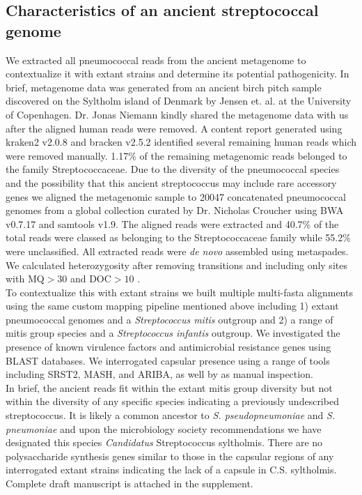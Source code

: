 \documentclass{article}
\begin{document}
\subsection{Characteristics of an ancient streptococcal genome }
We extracted all pneumococcal reads from the ancient metagenome to contextualize it with extant strains and determine its potential pathogenicity. In brief, metagenome data was generated from an ancient birch pitch sample discovered on the Syltholm island of Denmark by Jensen et. al. at the University of Copenhagen\cite{jensen5700YearoldHuman2019}. Dr. Jonas Niemann kindly shared the metagenome data with us after the aligned human reads were removed. A content report generated using kraken2 v2.0.8 and bracken v2.5.2 \cite{KrakenUltrafastMetagenomic,luBrackenEstimatingSpecies2017} identified several remaining human reads which were removed manually. 1.17\% of the remaining metagenomic reads belonged to the family Streptococcaceae. Due to the diversity of the pneumococcal species and the  possibility that this ancient streptococcus may include rare accessory genes we aligned the metagenomic sample to 20047 concatenated pneumococcal genomes from a global collection curated by Dr. Nicholas Croucher using BWA v0.7.17 and samtools v1.9\cite{liStatisticalFrameworkSNP2011,liFastAccurateShort2009,gladstoneInternationalGenomicDefinition2019b}. The aligned reads were extracted and 40.7\% of the total reads were classed as belonging to the Streptococcaceae family while 55.2\% were unclassified. All extracted reads were \textit{de novo} assembled using metaspades\cite{nurkMetaSPAdesNewVersatile2017}. We calculated heterozygosity after removing transitions and including only sites with MQ$>30$ and DOC$>10$ \cite{liStatisticalFrameworkSNP2011}. 
\\To contextualize this with extant strains we built multiple multi-fasta alignments using the same custom mapping pipeline mentioned above including 1) extant pneumococcal genomes and a \textit{Streptococcus mitis} outgroup and 2) a range of mitis group species and a \textit{Streptococcus infantis} outgroup. We investigated the presence of known virulence factors and antimicrobial resistance genes using BLAST databases. We interrogated capsular presence using a range of tools including SRST2, MASH, and ARIBA, as well by as manual inspection. \\In brief, the ancient reads fit within the extant mitis group diversity but not within the diversity of any specific species indicating a previously undescribed streptococcus. It is likely a common ancestor to \textit{S. pseudopneumoniae} and \textit{S. pneumoniae} and upon the microbiology society recommendations we have designated this species \textit{Candidatus} Streptococcus syltholmis. There are no polysaccharide synthesis genes similar to those in the capsular regions of any interrogated extant strains indicating the lack of a capsule in C.S. syltholmis. Complete draft manuscript is attached in the supplement.
\end{document}
